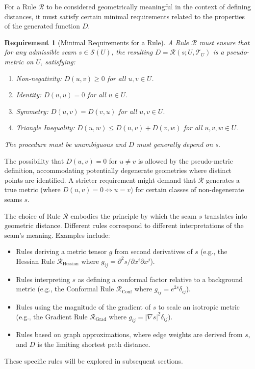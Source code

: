 \documentclass[twoside,twocolumn]{article}
\newtheorem{requirement}{Requirement}[definition]
\numberwithin{equation}{section} %
\begin{document}
For a Rule $\mathcal{R}$ to be considered geometrically meaningful in the context of defining distances, it must satisfy certain minimal requirements related to the properties of the generated function $D$.

\begin{requirement}[Minimal Requirements for a Rule]\label{req:RuleReqs}
A Rule \( \mathcal{R} \) must ensure that for any admissible seam \( s \in \mathcal{S}(U) \), the resulting \( D = \mathcal{R}(s; U, \mathcal{T}_U) \) is a pseudo-metric on \( U \), satisfying:
\begin{enumerate}[label=(M\arabic*)]
\item \textit{Non-negativity:} \( D(u, v) \ge 0 \) for all \( u, v \in U \).
\item \textit{Identity:} \( D(u, u) = 0 \) for all \( u \in U \).
\item \textit{Symmetry:} \( D(u, v) = D(v, u) \) for all \( u, v \in U \).
\item \textit{Triangle Inequality:} \( D(u, w) \le D(u, v) + D(v, w) \) for all \( u, v, w \in U \).
\end{enumerate}
The procedure must be unambiguous and \( D \) must generally depend on \( s \).
\end{requirement}

\noindent The possibility that $D(u, v) = 0$ for $u \neq v$ is allowed by the pseudo-metric definition, accommodating potentially degenerate geometries where distinct points are identified. A stricter requirement might demand that $\mathcal{R}$ generates a true metric (where $D(u, v) = 0 \iff u=v$) for certain classes of non-degenerate seams $s$.

The choice of Rule $\mathcal{R}$ embodies the principle by which the seam $s$ translates into geometric distance. Different rules correspond to different interpretations of the seam's meaning. Examples include:
\begin{itemize}
    \item Rules deriving a metric tensor $g$ from second derivatives of $s$ (e.g., the Hessian Rule $\mathcal{R}_{\text{Hessian}}$ where $g_{ij} = \partial^2 s / \partial x^i \partial x^j$).
    \item Rules interpreting $s$ as defining a conformal factor relative to a background metric (e.g., the Conformal Rule $\mathcal{R}_{\text{Conf}}$ where $g_{ij} = e^{2s} \delta_{ij}$).
    \item Rules using the magnitude of the gradient of $s$ to scale an isotropic metric (e.g., the Gradient Rule \( \mathcal{R}_{\text{Grad}} \) where \( g_{ij} = |\nabla s|^2 \delta_{ij} \)). %
    \item Rules based on graph approximations, where edge weights are derived from $s$, and $D$ is the limiting shortest path distance.
\end{itemize}
These specific rules will be explored in subsequent sections.
\end{document}
